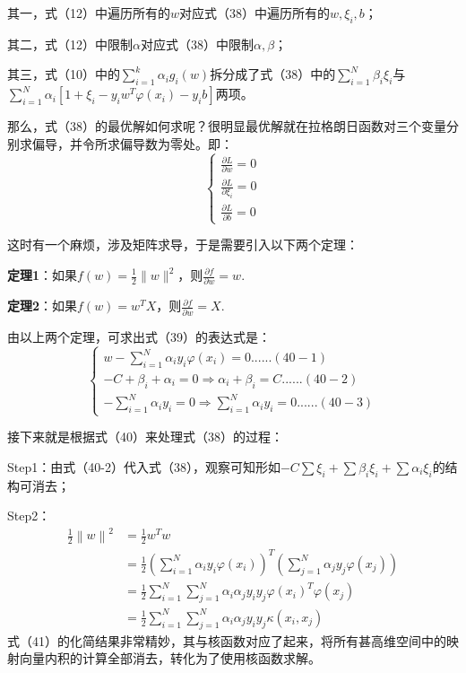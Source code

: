 其一，式（12）中遍历所有的$w$对应式（38）中遍历所有的$w,\xi_{i},b$；

其二，式（12）中限制$\alpha$对应式（38）中限制$\alpha,\beta $；

其三，式（10）中的$\sum_{i=1}^{k}\alpha_{i}g_{i}(w)$拆分成了式（38）中的$\sum_{i=1}^N\beta_i\xi_i$与
$\sum_{i=1}^N\alpha_i[1+\xi_i-y_iw^T\varphi(x_i)-y_ib]$两项。

那么，式（38）的最优解如何求呢？很明显最优解就在拉格朗日函数对三个变量分别求偏导，并令所求偏导数为零处。即：
\begin{equation}\begin{cases}\frac{\partial L}{\partial w}=0\\\frac{\partial L}{\partial\xi_i}=0\\\frac{\partial L}{\partial b}=0\end{cases}\end{equation}

这时有一个麻烦，涉及矩阵求导，于是需要引入以下两个定理：

\textbf{定理1}：如果$f(w)=\frac12\|w\|^2$，则$\frac{\partial f}{\partial w}=w$.

\textbf{定理2}：如果$f(w)=w^TX$，则$\frac{\partial f}{\partial w}=X$.

由以上两个定理，可求出式（39）的表达式是：
\begin{equation}\begin{cases}w-\sum_{i=1}^N\alpha_iy_i\varphi(x_i)=0......(40-1)\\-C+\beta_i+\alpha_i=0\Rightarrow\alpha_i+\beta_i=C......(40-2)\\-\sum_{i=1}^N\alpha_iy_i=0\Longrightarrow\sum_{i=1}^N\alpha_iy_i=0......(40-3)\end{cases}\end{equation}

接下来就是根据式（40）来处理式（38）的过程：

Step1：由式（40-2）代入式（38），观察可知形如$-C\sum\xi_i+\sum\beta_i\xi_i+\sum\alpha_i\xi_i$的结构可消去；

Step2：
\begin{equation}
	\begin{align}
		\frac{1}{2}{\left\|w\right\|}^2 &= \frac{1}{2}w^{T}w \\
		&= \frac{1}{2}(\sum_{i=1}^{N}\alpha_{i}y_{i}\varphi(x_{i}))^{T}(\sum_{j=1}^{N}\alpha_{j}y_{j}\varphi(x_{j})) \\
		&= \frac{1}{2}\sum_{i=1}^{N}\sum_{j=1}^{N}\alpha_{i}\alpha_{j}y_{i}y_{j}\varphi(x_{i})^{T}\varphi(x_{j}) \\
		&= \frac{1}{2}\sum_{i=1}^{N}\sum_{j=1}^{N}\alpha_{i}\alpha_{j}y_{i}y_{j}\kappa(x_{i},x_{j})
	\end{align}
\end{equation}
式（41）的化简结果非常精妙，其与核函数对应了起来，将所有甚高维空间中的映射向量内积的计算全部消去，转化为了使用核函数求解。


